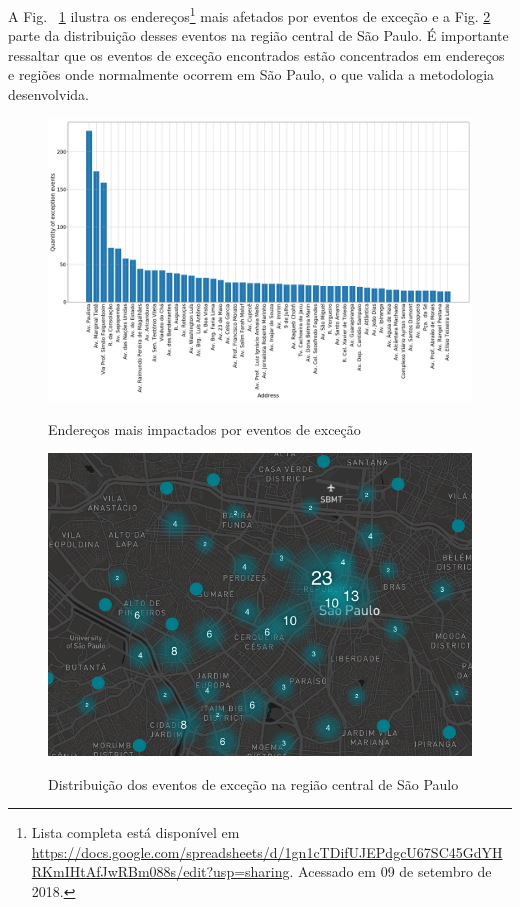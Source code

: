 \documentclass[
	12pt,				%
	oneside,			%
	a4paper,			%
	english,			%
	brazil				%
	]{abntex2ppgsi}
\begin{document}
A Fig. ~\ref{fig:address_analysis} ilustra os endereços\footnote{Lista completa está disponível em \url{https://docs.google.com/spreadsheets/d/1gn1cTDifUJEPdgcU67SC45GdYHRKmIHtAfJwRBm088s/edit?usp=sharing}. Acessado em 09 de setembro de 2018.} mais afetados por eventos de exceção e a Fig. \ref{fig:dispersion} parte da distribuição desses eventos na região central de São Paulo. É importante ressaltar que os eventos de exceção encontrados estão concentrados em endereços e regiões onde normalmente ocorrem em São Paulo, o que valida a metodologia desenvolvida.

\begin{figure}[!htb]
	\centering
 	  \caption{Endereços mais impactados por eventos de exceção}
		\includegraphics[width=1\linewidth]{images/address_analysis.png}
	\label{fig:address_analysis}
\end{figure}

\begin{figure}[!htb]
	\centering
 	  \caption{Distribuição dos eventos de exceção na região central de São Paulo}
		\includegraphics[width=1\linewidth]{images/light_map.png}
	\label{fig:dispersion}
\end{figure}
\end{document}

